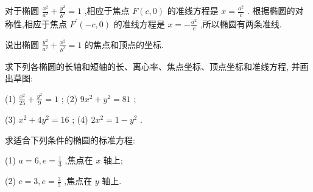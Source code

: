 \documentclass[lang=cn,newtx,12pt,scheme=chinese]{elegantbook}
\begin{document}
对于椭圆 \(\frac{{x}^{2}}{{a}^{2}} + \frac{{y}^{2}}{{b}^{2}} = 1\) ,相应于焦点 \(F\left( {c,0}\right)\) 的准线方程是 \(x = \frac{{a}^{2}}{c}\) . 根据椭圆的对称性,相应于焦点 \({F}^{\prime }\left( {-c,0}\right)\) 的准线方程是 \(x = - \frac{{a}^{2}}{c}\) ,所以椭圆有两条准线.

\begin{problemset}[练习]

\item 说出椭圆 \(\frac{{y}^{2}}{{a}^{2}} + \frac{{x}^{2}}{{b}^{2}} = 1\) 的焦点和顶点的坐标.

\item 求下列各椭圆的长轴和短轴的长、离心率、焦点坐标、顶点坐标和准线方程, 并画出草图:

(1) \(\frac{{x}^{2}}{25} + \frac{{y}^{2}}{9} = 1\) ; (2) \(9{x}^{2} + {y}^{2} = {81}\) ;

(3) \({x}^{2} + 4{y}^{2} = {16}\) ; (4) \(2{x}^{2} = 1 - {y}^{2}\) .

\item 求适合下列条件的椭圆的标准方程:

(1) \(a = 6,e = \frac{1}{3}\) ,焦点在 \(x\) 轴上;

(2) \(c = 3,e = \frac{3}{5}\) ,焦点在 \(y\) 轴上.

\end{problemset}
\end{document}

